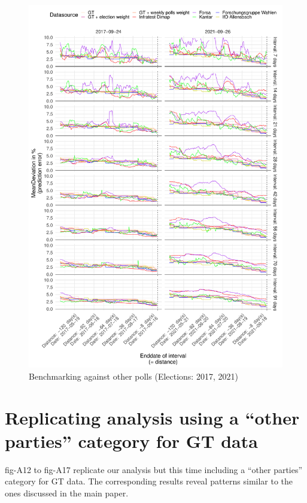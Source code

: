 \documentclass[
  letterpaper,
  DIV=11,
  numbers=noendperiod]{scrartcl}
\begin{document}
\begin{figure}[H]

\caption{\label{fig-A11}Benchmarking against other polls (Elections:
2017, 2021)}

{\centering \includegraphics{figures/fig-A11-1.pdf}

}

\end{figure}

\hypertarget{sec-other-parties}{%
\section{Replicating analysis using a ``other parties'' category for GT
data}\label{sec-other-parties}}

fig-A12 to fig-A17 replicate our analysis but this time including a
``other parties'' category for GT data. The corresponding results reveal
patterns similar to the ones discussed in the main paper.
\end{document}
